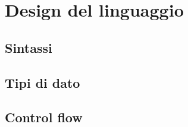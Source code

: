 \chapter{Design del linguaggio}

\section{Sintassi}

\section{Tipi di dato}

\section{Control flow}
